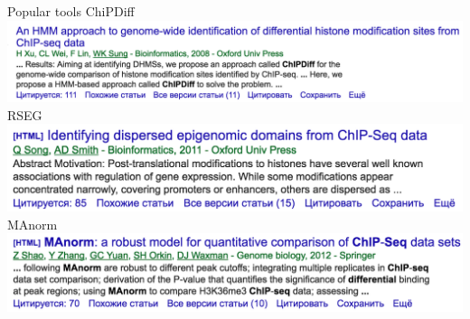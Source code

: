 \documentclass{beamer}
\begin{document}
\begin{frame}{Popular tools}
ChiPDiff\\
\includegraphics[width=\linewidth]{ChipDiff.png}\\
RSEG\\
\includegraphics[width=\linewidth]{RSEG.png}\\
MAnorm\\
\includegraphics[width=\linewidth]{MAnorm.png}\\
\end{frame}
\end{document}
